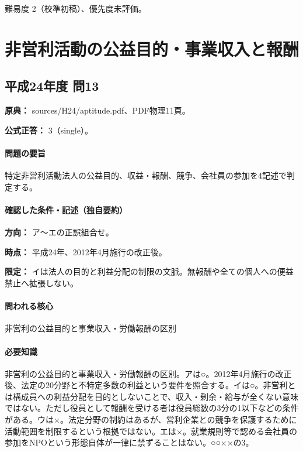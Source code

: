 \par 難易度 2（校準初稿）、優先度未評価。

\section{非営利活動の公益目的・事業収入と報酬}

\subsection{平成24年度 問13}
\label{q:h24-reg-apt-13}

\noindent\textbf{原典：} sources/H24/aptitude.pdf、PDF物理11頁。

\textbf{公式正答：} 3（single）。

\paragraph{問題の要旨} 特定非営利活動法人の公益目的、収益・報酬、競争、会社員の参加を4記述で判定する。

\paragraph{確認した条件・記述（独自要約）}\mbox{}\par

\noindent\textbf{方向：} ア〜エの正誤組合せ。\par

\noindent\textbf{時点：} 平成24年、2012年4月施行の改正後。\par

\noindent\textbf{限定：} イは法人の目的と利益分配の制限の文脈。無報酬や全ての個人への便益禁止へ拡張しない。\par

\paragraph{問われる核心} 非営利の公益目的と事業収入・労働報酬の区別

\paragraph{必要知識} 非営利の公益目的と事業収入・労働報酬の区別。アは○。2012年4月施行の改正後、法定の20分野と不特定多数の利益という要件を照合する。イは○。非営利とは構成員への利益分配を目的としないことで、収入・剰余・給与が全くない意味ではない。ただし役員として報酬を受ける者は役員総数の3分の1以下などの条件がある。ウは×。法定分野の制約はあるが、営利企業との競争を保護するために活動範囲を制限するという根拠ではない。エは×。就業規則等で認める会社員の参加をNPOという形態自体が一律に禁ずることはない。○○××の3。

